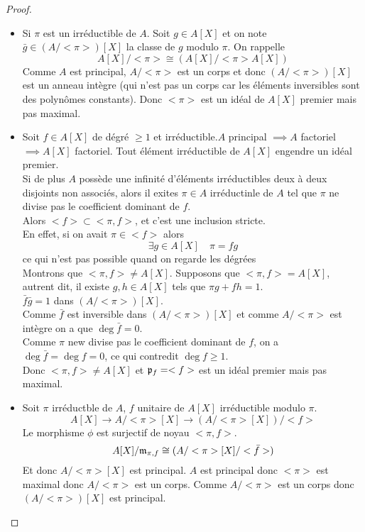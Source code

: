 \begin{proof}
	\begin{itemize}
		\item Si $\pi$ est un irréductible de $A$. Soit $g \in A[X]$ et on note $\bar{g} \in (A/<\pi>)[X]$ la classe de $g$ modulo $\pi$.
		      On rappelle
		      $$ A[X]/<\pi> \cong (A[X]/<\pi>A[X])$$
		      Comme $A$ est principal, $A/<\pi>$ est un corps et donc $(A/<\pi>)[X]$ est un anneau intègre (qui n'est pas un corps car les éléments
		      inversibles sont des polynômes constants). Donc $<\pi>$ est un idéal de $A[X]$ premier mais pas maximal.
		\item Soit $f \in A[X]$ de dégré $\geq 1$ et irréductible.$A$ principal $\implies A$ factoriel $\implies A[X]$ factoriel.
		      Tout élément irréductible de $A[X]$ engendre un idéal premier. \\
		      Si de plus $A$ possède une infinité d'éléments irréductibles deux à deux disjoints non associés, alors il exites $\pi \in A$ irréductinle de $A$
		      tel que $\pi$ ne divise pas le coefficient dominant de $f$.\\
		      Alors $<f>  \subset <\pi,f>$, et c'est une inclusion stricte.\\
		      En effet, si on avait $\pi \in <f>$ alors
		      $$\exists g \in A[X]\quad \pi = fg$$ ce qui n'est pas possible quand on regarde les dégrées \\
		      Montrons que $<\pi, f> \neq A[X]$.
		      Supposons que $<\pi, f> = A[X]$, autrent dit, il existe $g,h \in A[X]$ tels que $\pi g + fh = 1$.\\
		      $ \bar{f}\bar{g} = 1$ dans $(A/<\pi>)[X]$.\\
		      Comme $\bar{f}$ est inversible dans $(A/<\pi>)[X]$ et comme $A/<\pi>$ est intègre on a que $\deg \bar{f} = 0$.\\
		      Comme $\pi$ new divise pas le coefficient dominant de $f$, on a $\deg \bar{f} = \deg f = 0$, ce qui contredit $\deg f \geq 1$.\\
		      Donc $<\pi, f> \neq A[X]$ et $\mathfrak{p}_f = <f>$ est un idéal premier mais pas maximal.
		\item  Soit $\pi$ irréductble de $A$, $f$ unitaire de $A[X]$ irréductible modulo $\pi$.\\
		      $$A[X] \to A/<\pi>[X] \to (A/<\pi>[X])/<f> $$ %
		      Le morphisme $\phi$ est surjectif de noyau $<\pi,f>$.
		      $$ A[X]/\mathfrak{m}_{\pi,f} \cong (A/<\pi>[X]/<\bar{f}>)$$
		      Et donc $A/<\pi>[X]$ est principal.
		      $A$ est principal donc $<\pi>$ est maximal donc $A/<\pi>$ est un corps. Comme $A/<\pi>$ est un corps donc $(A/<\pi>)[X]$ est principal.\\

\end{itemize}
\end{proof}
